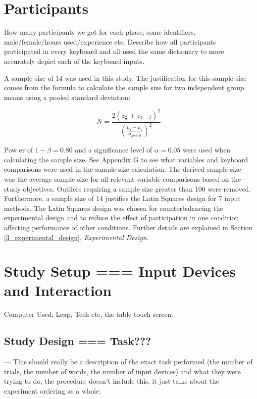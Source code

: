 \section{Participants}

How many participants we got for each phase, some identifiers, male/female/hours used/experience etc. Describe how all participants participated in every keyboard and all used the same dictionary to more accurately depict each of the keyboard inputs.

A sample size of 14 was used in this study. The justification for this sample size comes from the formula to calculate the sample size for two independent group means using a pooled standard deviation:

\begin{equation}
N = \frac{2(z_{\frac{\alpha}{2}} + z_{1-\beta})^2}{(\frac{\mu_1 - \mu_2}{\sigma_{pooled}})^2}
\end{equation}

Pow	er of $1-\beta = 0.80$ and a significance level of $\alpha = 0.05$ were used when calculating the sample size. See Appendix G to see what variables and keyboard comparisons were used in the sample size calculation. The derived sample size was the average sample size for all relevant variable comparisons based on the study objectives. Outliers requiring a sample size greater than 100 were removed. Furthermore, a sample size of 14 justifies the Latin Squares design for 7 input methods. The Latin Squares design was chosen for counterbalancing the experimental design and to reduce the effect of participation in one condition affecting performance of other conditions. Further details are explained in Section \ref{3_experimental_design}, \textit{Experimental Design}.

\section{Study Setup === Input Devices and Interaction}

Computer Used, Leap, Tech etc, the table touch screen.

\subsection{Study Design === Task???}

--- This should really be a description of the exact task performed (the number of trials, the number of words, the number of input devices) and what they were trying to do, the procedure doesn't include this, it just talks about the experiment ordering as a whole.

